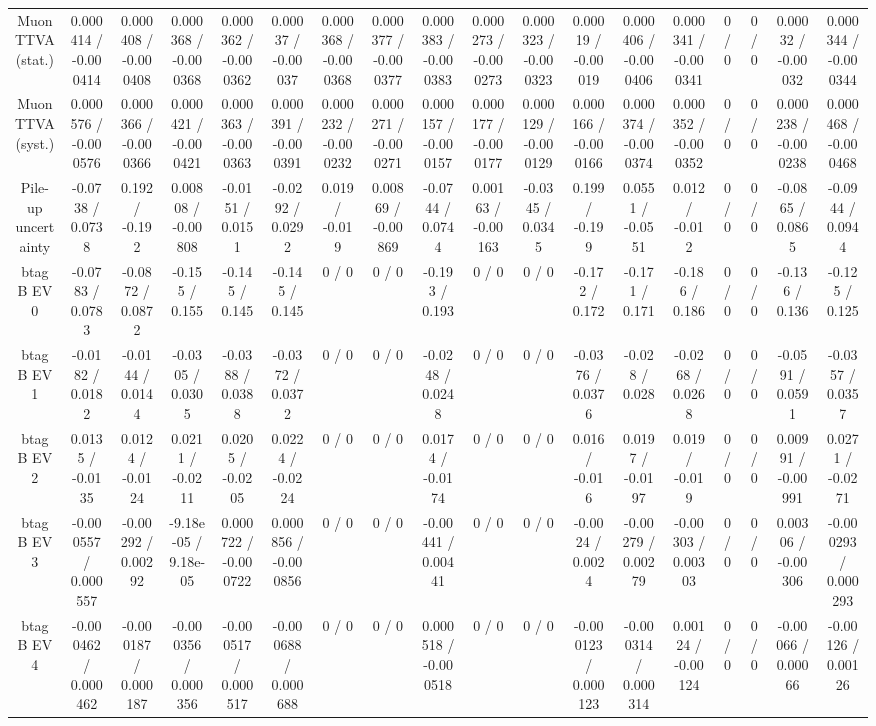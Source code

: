 \documentclass[10pt]{article}
\begin{document}
\begin{table}[htbp]
\begin{center}
\begin{tabular}{|c|c|c|c|c|c|c|c|c|c|c|c|c|c|c|c|c|c|}
  Muon TTVA (stat.) & 0.000414 / -0.000414 & 0.000408 / -0.000408 & 0.000368 / -0.000368 & 0.000362 / -0.000362 & 0.00037 / -0.00037 & 0.000368 / -0.000368 & 0.000377 / -0.000377 & 0.000383 / -0.000383 & 0.000273 / -0.000273 & 0.000323 / -0.000323 & 0.00019 / -0.00019 & 0.000406 / -0.000406 & 0.000341 / -0.000341 & 0 / 0 & 0 / 0 & 0.00032 / -0.00032 & 0.000344 / -0.000344 \\ 
  Muon TTVA (syst.) & 0.000576 / -0.000576 & 0.000366 / -0.000366 & 0.000421 / -0.000421 & 0.000363 / -0.000363 & 0.000391 / -0.000391 & 0.000232 / -0.000232 & 0.000271 / -0.000271 & 0.000157 / -0.000157 & 0.000177 / -0.000177 & 0.000129 / -0.000129 & 0.000166 / -0.000166 & 0.000374 / -0.000374 & 0.000352 / -0.000352 & 0 / 0 & 0 / 0 & 0.000238 / -0.000238 & 0.000468 / -0.000468 \\ 
  Pile-up uncertainty & -0.0738 / 0.0738 & 0.192 / -0.192 & 0.00808 / -0.00808 & -0.0151 / 0.0151 & -0.0292 / 0.0292 & 0.019 / -0.019 & 0.00869 / -0.00869 & -0.0744 / 0.0744 & 0.00163 / -0.00163 & -0.0345 / 0.0345 & 0.199 / -0.199 & 0.0551 / -0.0551 & 0.012 / -0.012 & 0 / 0 & 0 / 0 & -0.0865 / 0.0865 & -0.0944 / 0.0944 \\ 
  btag B EV 0 & -0.0783 / 0.0783 & -0.0872 / 0.0872 & -0.155 / 0.155 & -0.145 / 0.145 & -0.145 / 0.145 & 0 / 0 & 0 / 0 & -0.193 / 0.193 & 0 / 0 & 0 / 0 & -0.172 / 0.172 & -0.171 / 0.171 & -0.186 / 0.186 & 0 / 0 & 0 / 0 & -0.136 / 0.136 & -0.125 / 0.125 \\ 
  btag B EV 1 & -0.0182 / 0.0182 & -0.0144 / 0.0144 & -0.0305 / 0.0305 & -0.0388 / 0.0388 & -0.0372 / 0.0372 & 0 / 0 & 0 / 0 & -0.0248 / 0.0248 & 0 / 0 & 0 / 0 & -0.0376 / 0.0376 & -0.028 / 0.028 & -0.0268 / 0.0268 & 0 / 0 & 0 / 0 & -0.0591 / 0.0591 & -0.0357 / 0.0357 \\ 
  btag B EV 2 & 0.0135 / -0.0135 & 0.0124 / -0.0124 & 0.0211 / -0.0211 & 0.0205 / -0.0205 & 0.0224 / -0.0224 & 0 / 0 & 0 / 0 & 0.0174 / -0.0174 & 0 / 0 & 0 / 0 & 0.016 / -0.016 & 0.0197 / -0.0197 & 0.019 / -0.019 & 0 / 0 & 0 / 0 & 0.00991 / -0.00991 & 0.0271 / -0.0271 \\ 
  btag B EV 3 & -0.000557 / 0.000557 & -0.00292 / 0.00292 & -9.18e-05 / 9.18e-05 & 0.000722 / -0.000722 & 0.000856 / -0.000856 & 0 / 0 & 0 / 0 & -0.00441 / 0.00441 & 0 / 0 & 0 / 0 & -0.0024 / 0.0024 & -0.00279 / 0.00279 & -0.00303 / 0.00303 & 0 / 0 & 0 / 0 & 0.00306 / -0.00306 & -0.000293 / 0.000293 \\ 
  btag B EV 4 & -0.000462 / 0.000462 & -0.000187 / 0.000187 & -0.000356 / 0.000356 & -0.000517 / 0.000517 & -0.000688 / 0.000688 & 0 / 0 & 0 / 0 & 0.000518 / -0.000518 & 0 / 0 & 0 / 0 & -0.000123 / 0.000123 & -0.000314 / 0.000314 & 0.00124 / -0.00124 & 0 / 0 & 0 / 0 & -0.00066 / 0.00066 & -0.00126 / 0.00126 \\ 

\end{tabular}
\end{center}
\end{table}
\end{document}
